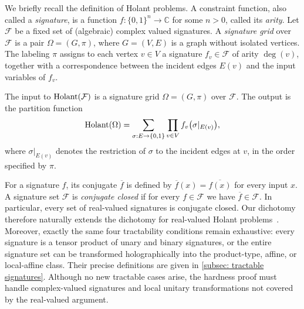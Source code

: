 We briefly recall the definition of Holant problems. A constraint function, also called a \emph{signature}, is a function $f:\{0,1\}^n\to\mathbb{C}$ for some $n>0$, called its \emph{arity}. %
Let $\mathcal{F}$ be a fixed set of (algebraic) complex valued signatures. A \emph{signature grid} over $\mathcal{F}$ is a pair $\Omega=(G,\pi)$, where $G=(V,E)$ is a graph without isolated vertices. The labeling $\pi$ assigns to each vertex $v\in V$ a signature $f_v\in\mathcal{F}$ of arity $\deg(v)$, together with a correspondence between the incident edges $E(v)$ and the input variables of $f_v$.

\begin{definition}
The input to $\operatorname{Holant}(\mathcal{F})$ is a signature grid $\Omega=(G,\pi)$ over $\mathcal{F}$. The output is the partition function
\[
    \operatorname{Holant}(\Omega)
    =\sum_{\sigma:E\to\{0,1\}}
      \prod_{v\in V}f_v\bigl(\sigma|_{E(v)}\bigr),
\]
where $\sigma|_{E(v)}$ denotes the restriction of $\sigma$ to the incident edges at $v$, in the order specified by $\pi$.
\end{definition}

For a signature $f$, its conjugate $\overline f$ is defined by $\overline f(x)=\overline{f(x)}$ for every input $x$. A signature set $\mathcal{F}$ is \emph{conjugate closed} if for every $f\in \mathcal{F}$ we have $\overline{f}\in \mathcal{F}$.
In particular, every set of real-valued signatures is conjugate closed. Our dichotomy therefore naturally extends the dichotomy for real-valued Holant problems~\cite{realholant}. Moreover, exactly the same four tractability conditions remain exhaustive: every signature is a tensor product of unary and binary signatures, or the entire signature set can be transformed holographically into the product-type, affine, or local-affine class. Their precise definitions are given in \cref{subsec: tractable signatures}. Although no new tractable cases arise, the hardness proof must handle complex-valued signatures and local unitary transformations not covered by the real-valued argument.

